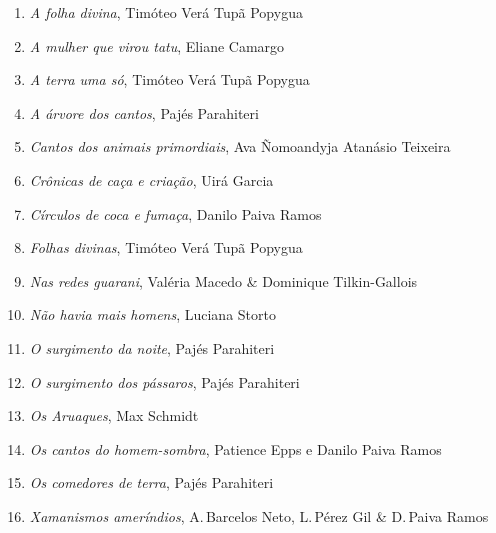 \begin{enumerate}
\setlength\parskip{4.2pt}
\setlength\itemsep{-1.4mm}
\item \textit{A folha divina}, Timóteo Verá Tupã Popygua
\item \textit{A mulher que virou tatu}, Eliane Camargo
\item \textit{A terra uma só}, Timóteo Verá Tupã Popygua
\item \textit{A árvore dos cantos}, Pajés Parahiteri
\item \textit{Cantos dos animais primordiais}, Ava Ñomoandyja Atanásio Teixeira
\item \textit{Crônicas de caça e criação}, Uirá Garcia
\item \textit{Círculos de coca e fumaça}, Danilo Paiva Ramos
\item \textit{Folhas divinas}, Timóteo Verá Tupã Popygua
\item \textit{Nas redes guarani}, Valéria Macedo \& Dominique Tilkin-Gallois
\item \textit{Não havia mais homens}, Luciana Storto
\item \textit{O surgimento da noite}, Pajés Parahiteri
\item \textit{O surgimento dos pássaros}, Pajés Parahiteri
\item \textit{Os Aruaques}, Max Schmidt
\item \textit{Os cantos do homem-sombra}, Patience Epps e Danilo Paiva Ramos
\item \textit{Os comedores de terra}, Pajés Parahiteri
\item \textit{Xamanismos ameríndios}, A.\,Barcelos Neto, L.\,Pérez Gil \& D.\,Paiva Ramos
\end{enumerate}




